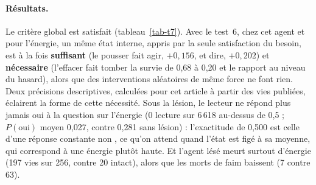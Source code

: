 \documentclass[11pt,a4paper]{article}
\begin{document}
\paragraph{Résultats.} Le critère global est satisfait (tableau~\ref{tab-t7}).
Avec le test~6, chez cet agent et pour l'énergie, un même état interne, appris par
la seule satisfaction du besoin, est à la fois \textbf{suffisant} (le pousser fait
agir, $+0,156$, et dire, $+0,202$) et \textbf{nécessaire} (l'effacer fait tomber la
survie de 0,68 à 0,20 et le rapport au niveau du hasard), alors que des
interventions aléatoires de même force ne font rien. Deux précisions descriptives,
calculées pour cet article à partir des vies publiées, éclairent la forme de cette
nécessité. Sous la lésion, le lecteur ne répond plus jamais \og oui \fg{} à la
question sur l'énergie (0 lecture sur 6\,618 au-dessus de 0,5 ; $P(\text{oui})$
moyen 0,027, contre 0,281 sans lésion) : l'exactitude de 0,500 est celle d'une
réponse constante \og non \fg{}, ce qu'on attend quand l'état est figé à sa moyenne,
qui correspond à une énergie plutôt haute. Et l'agent lésé meurt surtout
d'énergie (197 vies sur 256, contre 20 intact), alors que les morts de faim
baissent (7 contre 63).
\end{document}
